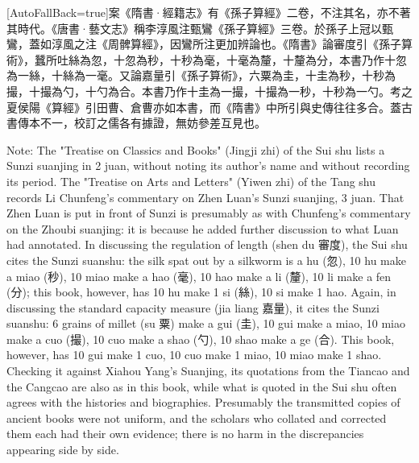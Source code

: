 \documentclass[11pt]{article}
\newcommand{\unitlabel}[1]{\marginpar{\raggedleft\tiny\color{gray}#1}}
\newenvironment{unitzh}{\par\CJKfontspec{Noto Serif CJK SC}[AutoFallBack=true]\large\linespread{1.25}\selectfont}{\par}
\newenvironment{uniten}{\par\small\color{black!85}}{\par\medskip}
\begin{document}
\begin{unitzh}\unitlabel{sunzi-001.3}案《隋書·經籍志》有《孫子算經》二卷，不注其名，亦不著其時代。《唐書·藝文志》稱李淳風注甄鸞《孫子算經》三卷。於孫子上冠以甄鸞，蓋如淳風之注《周髀算經》，因鸞所注更加辨論也。《隋書》論審度引《孫子算術》，蠶所吐絲為忽，十忽為秒，十秒為毫，十毫為釐，十釐為分，本書乃作十忽為一絲，十絲為一毫。又論嘉量引《孫子算術》，六粟為圭，十圭為秒，十秒為撮，十撮為勺，十勺為合。本書乃作十圭為一撮，十撮為一秒，十秒為一勺。考之夏侯陽《算經》引田曹、倉曹亦如本書，而《隋書》中所引與史傳往往多合。蓋古書傳本不一，校訂之儒各有據證，無妨參差互見也。\end{unitzh}
\begin{uniten}Note: The "Treatise on Classics and Books" (Jingji zhi) of the Sui shu lists a Sunzi suanjing in 2 juan, without noting its author's name and without recording its period. The "Treatise on Arts and Letters" (Yiwen zhi) of the Tang shu records Li Chunfeng's commentary on Zhen Luan's Sunzi suanjing, 3 juan. That Zhen Luan is put in front of Sunzi is presumably as with Chunfeng's commentary on the Zhoubi suanjing: it is because he added further discussion to what Luan had annotated. In discussing the regulation of length (shen du 審度), the Sui shu cites the Sunzi suanshu: the silk spat out by a silkworm is a hu (忽), 10 hu make a miao (秒), 10 miao make a hao (毫), 10 hao make a li (釐), 10 li make a fen (分); this book, however, has 10 hu make 1 si (絲), 10 si make 1 hao. Again, in discussing the standard capacity measure (jia liang 嘉量), it cites the Sunzi suanshu: 6 grains of millet (su 粟) make a gui (圭), 10 gui make a miao, 10 miao make a cuo (撮), 10 cuo make a shao (勺), 10 shao make a ge (合). This book, however, has 10 gui make 1 cuo, 10 cuo make 1 miao, 10 miao make 1 shao. Checking it against Xiahou Yang's Suanjing, its quotations from the Tiancao and the Cangcao are also as in this book, while what is quoted in the Sui shu often agrees with the histories and biographies. Presumably the transmitted copies of ancient books were not uniform, and the scholars who collated and corrected them each had their own evidence; there is no harm in the discrepancies appearing side by side.\end{uniten}
\end{document}
